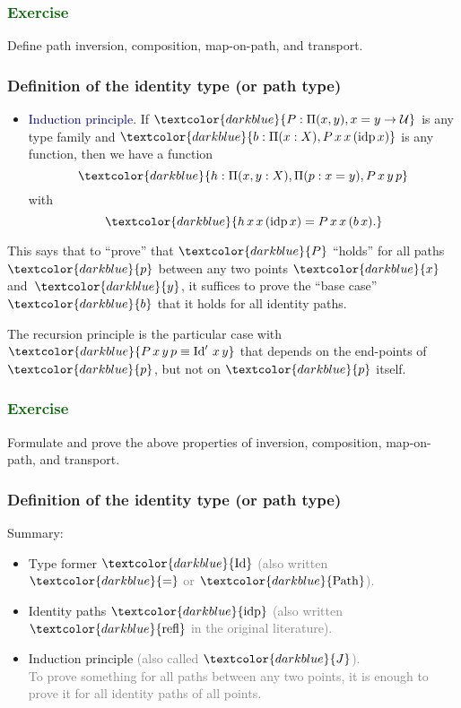 \documentclass[aspectratio=169]{beamer}
\newcommand{\eqq}{\equiv}
\newcommand{\U}{\operatorname{\mathcal{U}}}
\newcommand{\db}{\textcolor{darkblue}}
\newcommand{\dg}{\textcolor{darkgreen}}
\newcommand{\grey}{\textcolor{grey}}
\newcommand{\m}[1]{$\db{#1}$}
\newcommand{\M}[1]{\[\db{#1}\]}
\newcommand{\refl}{\operatorname{refl}}
\newcommand{\idp}{\operatorname{idp}}
\newcommand{\Id}{\operatorname{Id}}
\newcommand{\Path}{\operatorname{Path}}
\begin{document}
\begin{frame} \frametitle{\dg{Exercise}}

  Define path inversion, composition, map-on-path, and transport.

\end{frame}


 \begin{frame}
  \frametitle{Definition of the identity type (or path type)}

  \begin{itemize}
  \item \db{Induction principle}. If \m{P : \Pi(x,y), x=y \to \U} is any type family and \m{b : \Pi(x:X), P\,x\,x\,(\idp x)} is any function, then we have a function
    \M{h : \Pi(x,y:X), \Pi(p:x=y), P\,x\,y\, p}
    with
    \M{h \, x \, x\, (\idp x) = P \, x \, x\, (b\, x).}
  \end{itemize}

  \vfill

  This says that to ``prove'' that \m{P} ``holds'' for all paths \m{p}
  between any two points \m{x} and~\m{y}, it suffices to prove the
  ``base case'' \m{b} that it holds for all identity paths.

  \vfill

  The recursion principle is the particular case with \m{P \, x\,y\,p
    \eqq \Id' \,x \,y} that depends on the end-points of \m{p}, but not
  on \m{p} itself.

 \end{frame}

\begin{frame} \frametitle{\dg{Exercise}}

  Formulate and prove the above properties of inversion, composition, map-on-path, and transport.

\end{frame}


 \begin{frame}
  \frametitle{Definition of the identity type (or path type)}

  Summary:
  \begin{itemize}
  \vfill \item Type former \m{\Id} \grey{(also written \m{=} or \m{\Path}).}
  \vfill \item Identity paths \m{\idp} \grey{(also written \m{\refl} in the original literature).}
  \vfill \item Induction principle \grey{(also called \m{J}).} \\[1ex] \grey{To prove something for all paths between any two points, it is enough to prove it for all identity paths of all points.}
  \end{itemize}

 \end{frame}
\end{document}

